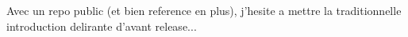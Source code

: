 Avec un repo public (et bien reference en plus), j'hesite a mettre la traditionnelle introduction delirante d'avant release...